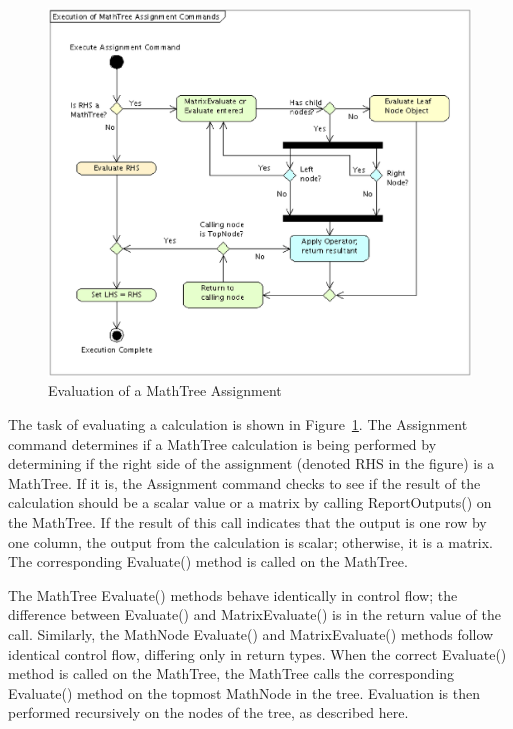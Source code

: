 \begin{figure}
\begin{center}
\includegraphics[scale=0.5]{Images/MathTreeExecution.eps}
\caption{\label{figure:MathTreeExecution}Evaluation of a MathTree Assignment}
\end{center}
\end{figure}

The task of evaluating a calculation is shown in Figure~\ref{figure:MathTreeExecution}.  The
Assignment command determines if a MathTree calculation is being performed by determining if the
right side of the assignment (denoted RHS in the figure) is a MathTree.  If it is, the Assignment
command checks to see if the result of the calculation should be a scalar value or a matrix by
calling ReportOutputs() on the MathTree.  If the result of this call indicates that the output is
one row by one column, the output from the calculation is scalar; otherwise, it is a matrix.  The
corresponding Evaluate() method is called on the MathTree.

The MathTree Evaluate() methods behave identically in control flow; the
difference between Evaluate() and MatrixEvaluate() is in the return value of
the call.  Similarly, the MathNode Evaluate() and MatrixEvaluate() methods
follow identical control flow, differing only in return types.  When the
correct Evaluate() method is called on the MathTree, the MathTree calls the
corresponding Evaluate() method on the topmost MathNode in the tree.
Evaluation is then performed recursively on the nodes of the tree, as described
here.

